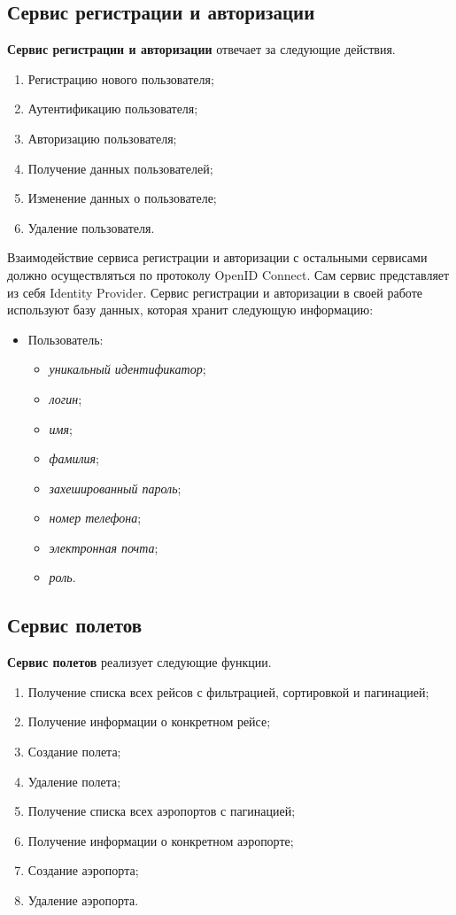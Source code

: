 \subsection{Сервис регистрации и авторизации}

\textbf{Сервис регистрации и авторизации} отвечает за следующие действия.
\begin{enumerate}
	\item Регистрацию нового пользователя;
	\item Аутентификацию пользователя;
	\item Авторизацию пользователя;
  \item Получение данных пользователей;
  \item Изменение данных о пользователе;
	\item Удаление пользователя.
\end{enumerate}

Взаимодействие сервиса регистрации и авторизации с остальными сервисами должно осуществляться по протоколу OpenID Connect. Сам сервис представляет из себя Identity Provider. Сервис регистрации и авторизации в своей работе используют базу данных, которая хранит следующую информацию:
\begin{itemize}
    \item Пользователь:
    \begin{itemize}
        \item \textit{уникальный идентификатор};
        \item \textit{логин};
        \item \textit{имя};
        \item \textit{фамилия};
        \item \textit{захешированный пароль};
        \item \textit{номер телефона};
        \item \textit{электронная почта};
        \item \textit{роль}.
    \end{itemize}
\end{itemize}


\subsection{Сервис полетов}

\textbf{Сервис полетов} реализует следующие функции.
\begin{enumerate}
	\item Получение списка всех рейсов с фильтрацией, сортировкой и пагинацией;
	\item Получение информации о конкретном рейсе;
	\item Создание полета;
	\item Удаление полета;
  \item Получение списка всех аэропортов с пагинацией;
	\item Получение информации о конкретном аэропорте;
	\item Создание аэропорта;
	\item Удаление аэропорта.
\end{enumerate}

